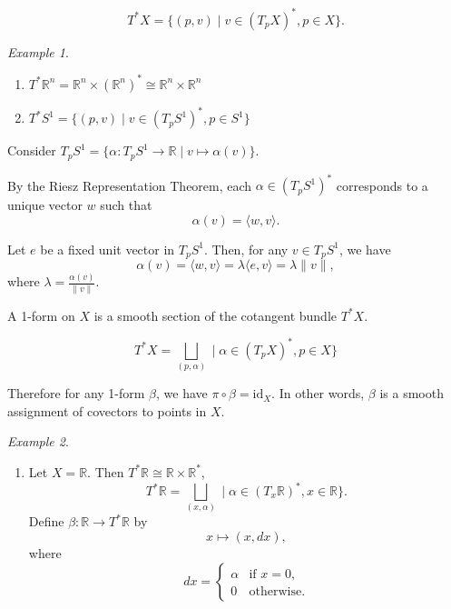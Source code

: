 \documentclass[11pt]{article}
\theoremstyle{definition}
\theoremstyle{remark}
\newtheorem{example}{Example}[section]
\begin{document}
\[
T^*X = \{(p, v) \mid v \in (T_p X)^*, p \in X\}.
\]

\begin{example}\label{ex:cotangent_bundle_examples}
\begin{enumerate}
    \item $T^* \mathbb{R}^n = \mathbb{R}^n \times (\mathbb{R}^n)^* \cong \mathbb{R}^n \times \mathbb{R}^n$

    \item $T^* S^1 = \{(p, v) \mid v \in (T_p S^1)^*, p \in S^1\}$
\end{enumerate}

Consider $T_p S^1 = \{\alpha : T_p S^1 \to \mathbb{R} \mid v \mapsto \alpha(v)\}$.

By the Riesz Representation Theorem, each $\alpha \in (T_p S^1)^*$ corresponds to a unique vector $w$ such that
\[
\alpha(v) = \langle w, v \rangle.
\]

Let $e$ be a fixed unit vector in $T_p S^1$. Then, for any $v \in T_p S^1$, we have
\[
\alpha(v) = \langle w, v \rangle = \lambda \langle e, v \rangle = \lambda \|v\|,
\]
where $\lambda = \frac{\alpha(v)}{\|v\|}$.
\end{example}

A 1-form on $X$ is a smooth section of the cotangent bundle $T^*X$.

\[
T^*X = \bigsqcup_{(p,\alpha)} \mid \alpha \in (T_pX)^*, p \in X \big\}
\]

Therefore for any 1-form $\beta$, we have $\pi \circ \beta = \mathrm{id}_X$. In other words, $\beta$ is a smooth assignment of covectors to points in $X$.

\begin{example}\label{ex:cotangent_bundle_example}
    \begin{enumerate}
        \item Let $X = \mathbb{R}$. Then $T^*\mathbb{R} \cong \mathbb{R} \times \mathbb{R}^*$,
        \[
        T^*\mathbb{R} = \bigsqcup_{(x,\alpha)} \mid \alpha \in (T_x\mathbb{R})^*, x \in \mathbb{R} \big\}.
        \]
        Define $\beta : \mathbb{R} \to T^*\mathbb{R}$ by
        \[
        x \mapsto (x, d x),
        \]
        where
        \[
        d x =
        \begin{cases}
        \alpha & \text{if } x = 0, \\
        0 & \text{otherwise}.
        \end{cases}
        \]
    \end{enumerate}
\end{example}
\end{document}
